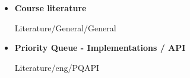 \begin{frame}{\LectureFurtherLiterature}
  \begin{itemize}
    \item
      \textbf{Course literature}
      \begin{btSect}{Literature/General/General}
        \btPrintAll
      \end{btSect}
  \end{itemize}
\end{frame}


\begin{frame}{\LectureFurtherLiterature}
  \begin{itemize}
    \item
      \textbf{Priority Queue - Implementations / API}
      \begin{btSect}{Literature/eng/PQAPI}
        \btPrintAll
      \end{btSect}
  \end{itemize}
\end{frame}
